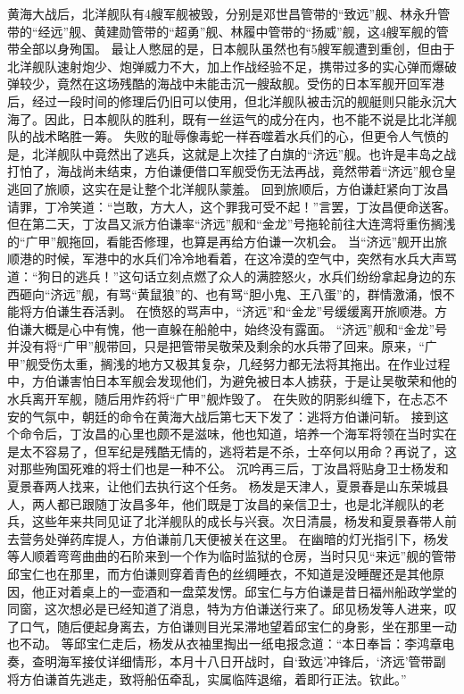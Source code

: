 \documentclass[12pt,UTF8]{ctexbook}
\begin{document}
黄海大战后，北洋舰队有4艘军舰被毁，分别是邓世昌管带的“致远”舰、林永升管带的“经远”舰、黄建勋管带的“超勇”舰、林履中管带的“扬威”舰，这4艘军舰的管带全部以身殉国。
最让人憋屈的是，日本舰队虽然也有5艘军舰遭到重创，但由于北洋舰队速射炮少、炮弹威力不大，加上作战经验不足，携带过多的实心弹而爆破弹较少，竟然在这场残酷的海战中未能击沉一艘敌舰。受伤的日本军舰开回军港后，经过一段时间的修理后仍旧可以使用，但北洋舰队被击沉的舰艇则只能永沉大海了。因此，日本舰队的胜利，既有一丝运气的成分在内，也不能不说是比北洋舰队的战术略胜一筹。
失败的耻辱像毒蛇一样吞噬着水兵们的心，但更令人气愤的是，北洋舰队中竟然出了逃兵，这就是上次挂了白旗的“济远”舰。也许是丰岛之战打怕了，海战尚未结束，方伯谦便借口军舰受伤无法再战，竟然带着“济远”舰仓皇逃回了旅顺，这实在是让整个北洋舰队蒙羞。
回到旅顺后，方伯谦赶紧向丁汝昌请罪，丁冷笑道：“岂敢，方大人，这个罪我可受不起！”言罢，丁汝昌便命送客。但在第二天，丁汝昌又派方伯谦率“济远”舰和“金龙”号拖轮前往大连湾将重伤搁浅的“广甲”舰拖回，看能否修理，也算是再给方伯谦一次机会。
当“济远”舰开出旅顺港的时候，军港中的水兵们冷冷地看着，在这冷漠的空气中，突然有水兵大声骂道：“狗日的逃兵！”这句话立刻点燃了众人的满腔怒火，水兵们纷纷拿起身边的东西砸向“济远”舰，有骂“黄鼠狼”的、也有骂“胆小鬼、王八蛋”的，群情激涌，恨不能将方伯谦生吞活剥。
在愤怒的骂声中，“济远”和“金龙”号缓缓离开旅顺港。方伯谦大概是心中有愧，他一直躲在船舱中，始终没有露面。
“济远”舰和“金龙”号并没有将“广甲”舰带回，只是把管带吴敬荣及剩余的水兵带了回来。原来，“广甲”舰受伤太重，搁浅的地方又极其复杂，几经努力都无法将其拖出。在作业过程中，方伯谦害怕日本军舰会发现他们，为避免被日本人掳获，于是让吴敬荣和他的水兵离开军舰，随后用炸药将“广甲”舰炸毁了。
在失败的阴影纠缠下，在忐忑不安的气氛中，朝廷的命令在黄海大战后第七天下发了：逃将方伯谦问斩。
接到这个命令后，丁汝昌的心里也颇不是滋味，他也知道，培养一个海军将领在当时实在是太不容易了，但军纪是残酷无情的，逃将若是不杀，士卒何以用命？再说了，这对那些殉国死难的将士们也是一种不公。
沉吟再三后，丁汝昌将贴身卫士杨发和夏景春两人找来，让他们去执行这个任务。
杨发是天津人，夏景春是山东荣城县人，两人都已跟随丁汝昌多年，他们既是丁汝昌的亲信卫士，也是北洋舰队的老兵，这些年来共同见证了北洋舰队的成长与兴衰。次日清晨，杨发和夏景春带人前去营务处弹药库提人，方伯谦前几天便被关在这里。
在幽暗的灯光指引下，杨发等人顺着弯弯曲曲的石阶来到一个作为临时监狱的仓房，当时只见“来远”舰的管带邱宝仁也在那里，而方伯谦则穿着青色的丝绸睡衣，不知道是没睡醒还是其他原因，他正对着桌上的一壶酒和一盘菜发愣。邱宝仁与方伯谦是昔日福州船政学堂的同窗，这次想必是已经知道了消息，特为方伯谦送行来了。邱见杨发等人进来，叹了口气，随后便起身离去，方伯谦则目光呆滞地望着邱宝仁的身影，坐在那里一动也不动。
等邱宝仁走后，杨发从衣袖里掏出一纸电报念道：“本日奉旨：李鸿章电奏，查明海军接仗详细情形，本月十八日开战时，自‘致远’冲锋后，‘济远’管带副将方伯谦首先逃走，致将船伍牵乱，实属临阵退缩，着即行正法。钦此。”
\end{document}
